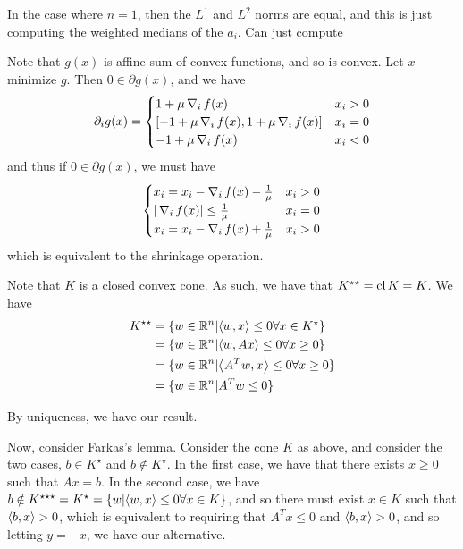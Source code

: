 \begin{exercises}
  In the case where $n = 1$, then the $L^{1}$ and $L^{2}$ norms are
  equal, and this is just computing the weighted medians of the
  $a_{i}$.  Can just compute

\item Note that $g(x)$ is affine sum of convex functions, and so is
  convex. Let $x$ minimize $g$.  Then $0 \in \partial g(x)$, and we
  have
  \begin{equation}
    \label{eq:34}
    \partial_{i} g(x) =
    \begin{cases}
      1 + \mu \grad_{i} f(x) & x_{i} > 0 \\
      [-1 + \mu \grad_{i} f(x), 1 + \mu \grad_{i} f(x)] & x_{i} = 0 \\
      -1 + \mu \grad_{i} f(x) & x_{i} < 0
    \end{cases}
  \end{equation} and thus if $0 \in \partial g(x)$, we must have
  \begin{align}
    \label{eq:35}
    \begin{cases}
      x_{i} = x_{i} - \operatorname*{\nabla}_{i} f(x) - \frac{1}{\mu} & x_{i} > 0 \\
      | \operatorname*{\nabla}_{i} f(x) | \leq \frac{1}{\mu} & x_{i} = 0 \\
      x_{i} = x_{i} - \operatorname*{\nabla}_{i} f(x) + \frac{1}{\mu} & x_{i} > 0
    \end{cases} 
  \end{align} which is equivalent to the shrinkage operation.
\item Note that $K$ is a closed convex cone.  As such, we have that
  $K^{\star \star} = \operatorname*{cl} K = K$. We have
  \begin{align}
    \label{eq:37}
    K^{\star \star} &= \{ w \in \R^{n} | \IP{w, x} \leq 0 \forall x \in
    K^{\star} \} \\
    &= \{ w \in \R^{n} | \IP{w, Ax} \leq 0 \forall x \geq 0 \} \\
    &= \{ w \in \R^{n} | \IP{A^{T}w, x} \leq 0 \forall x \geq 0 \} \\
    &= \{ w \in \R^{n} | A^{T} w \leq 0 \}
  \end{align}

  By uniqueness, we have our result.

  Now, consider Farkas's lemma. Consider the cone $K$ as above, and
  consider the two cases, $b \in K^{\star}$ and $b \notin K^{\star}$.
  In the first case, we have that there exists $x \geq 0$ such that
  $Ax = b$. In the second case, we have $b \notin K^{\star \star
    \star} = K^{\star} = \{ w | \IP{w, x} \leq 0 \forall x \in K \}$,
  and so there must exist $x \in K$ such that $\IP{b, x} > 0$, which
  is equivalent to requiring that $A^{T} x \leq 0$ and $\IP{b, x} >
  0$, and so letting $y = -x$, we have our alternative.


\end{exercises}
